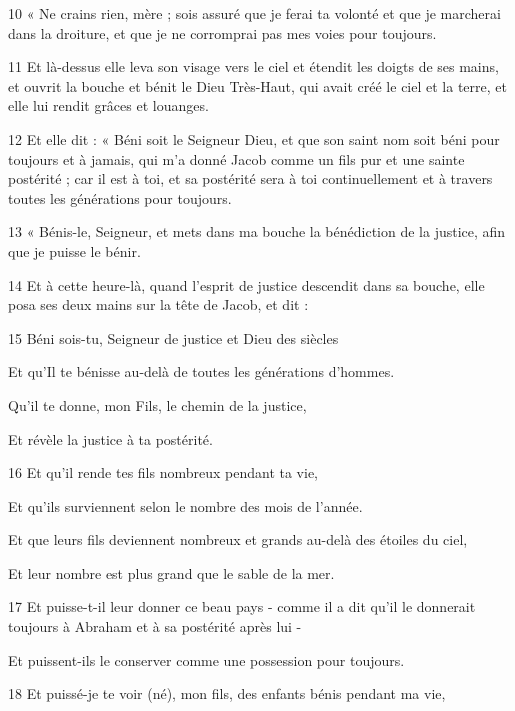 \par 10 « Ne crains rien, mère ; sois assuré que je ferai ta volonté et que je marcherai dans la droiture, et que je ne corromprai pas mes voies pour toujours.
\par 11 Et là-dessus elle leva son visage vers le ciel et étendit les doigts de ses mains, et ouvrit la bouche et bénit le Dieu Très-Haut, qui avait créé le ciel et la terre, et elle lui rendit grâces et louanges.
\par 12 Et elle dit : « Béni soit le Seigneur Dieu, et que son saint nom soit béni pour toujours et à jamais, qui m'a donné Jacob comme un fils pur et une sainte postérité ; car il est à toi, et sa postérité sera à toi continuellement et à travers toutes les générations pour toujours.
\par 13 « Bénis-le, Seigneur, et mets dans ma bouche la bénédiction de la justice, afin que je puisse le bénir.
\par 14 Et à cette heure-là, quand l'esprit de justice descendit dans sa bouche, elle posa ses deux mains sur la tête de Jacob, et dit :
\par    
\par 15 Béni sois-tu, Seigneur de justice et Dieu des siècles  
\par     Et qu'Il te bénisse au-delà de toutes les générations d'hommes.
\par    
\par     Qu'il te donne, mon Fils, le chemin de la justice,  
\par     Et révèle la justice à ta postérité.
\par    
\par 16 Et qu'il rende tes fils nombreux pendant ta vie,  
\par     Et qu'ils surviennent selon le nombre des mois de l'année.  
\par     Et que leurs fils deviennent nombreux et grands au-delà des étoiles du ciel,  
\par     Et leur nombre est plus grand que le sable de la mer.
\par    
\par 17 Et puisse-t-il leur donner ce beau pays - comme il a dit qu'il le donnerait toujours à Abraham et à sa postérité après lui -  
\par     Et puissent-ils le conserver comme une possession pour toujours.
\par    
\par 18 Et puissé-je te voir (né), mon fils, des enfants bénis pendant ma vie,  
